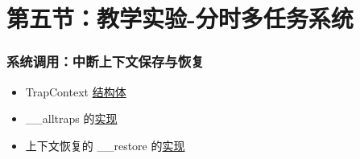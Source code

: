 \section{第五节：教学实验-分时多任务系统}%
\begin{frame}
	\frametitle{系统调用：中断上下文保存与恢复}
    \begin{itemize}
  		\item  TrapContext \href{https://github.com/rcore-os/rCore-Tutorial-v3/blob/ch3-coop/os/src/trap/context.rs\#L4}{结构体}
		\item  \_\_alltraps 的\href{https://github.com/rcore-os/rCore-Tutorial-v3/blob/ch3-coop/os/src/trap/trap.S\#L12}{实现}
		\item 上下文恢复的 \_\_restore 的\href{https://github.com/rcore-os/rCore-Tutorial-v3/blob/ch3-coop/os/src/trap/trap.S\#L40}{实现}
    \end{itemize}	
\end{frame}
	
